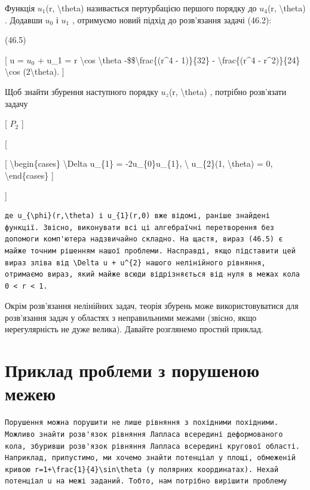 \documentclass[
]{article}
\begin{document}
{{{Функція \(u_1\)(r, \textbackslash theta) називається пертурбацією
першого порядку до \(u_4\)(r, \textbackslash theta) . Додавши \(u_0\) і
\(u_1\) , отримуємо новий підхід до розв'язання задачі (46.2):

(46.5)

{[} u = \(u_0\) + u\_1 = r \textbackslash cos \textbackslash theta
-\$\$\textbackslash frac\{(r\^{}4 - 1)\}\{32\} -
\textbackslash frac\{(r\^{}4 - r\^{}2)\}\{24\} \textbackslash cos
(2\textbackslash theta). {]}

Щоб знайти збурення наступного порядку \(u_{z}\)(r,
\textbackslash theta) , потрібно розв'язати задачу

{[} \(P_{2}\) {]}

{[}

{[} \textbackslash begin\{cases\} \textbackslash Delta u\_\{1\} =
-2u\_\{0\}u\_\{1\}, \textbackslash{} u\_\{2\}(1, \textbackslash theta) =
0, \textbackslash end\{cases\} {]}

{]}

\begin{verbatim}
де u_{\phi}(r,\theta) і u_{1}(r,0) вже відомі, раніше знайдені функції. Звісно, виконувати всі ці алгебраїчні перетворення без допомоги комп'ютера надзвичайно складно. На щастя, вираз (46.5) є майже точним рішенням нашої проблеми. Насправді, якщо підставити цей вираз зліва від \Delta u + u^{2} нашого нелінійного рівняння, отримаємо вираз, який майже всюди відрізняється від нуля в межах кола 0 < r < 1.
\end{verbatim}

Окрім розв'язання нелінійних задач, теорія збурень може
використовуватися для розв'язання задач у областях з неправильними
межами (звісно, якщо нерегулярність не дуже велика). Давайте розглянемо
простий приклад.

\section{Приклад проблеми з порушеною
межею}\label{ux43fux440ux438ux43aux43bux430ux434-ux43fux440ux43eux431ux43bux435ux43cux438-ux437-ux43fux43eux440ux443ux448ux435ux43dux43eux44e-ux43cux435ux436ux435ux44e}

\begin{verbatim}
Порушення можна порушити не лише рівняння з похідними похідними. Можливо знайти розв'язок рівняння Лапласа всередині деформованого кола, збуривши розв'язок рівняння Лапласа всередині кругової області. Наприклад, припустимо, ми хочемо знайти потенціал у площі, обмеженій кривою r=1+\frac{1}{4}\sin\theta (у полярних координатах). Нехай потенціал u на межі заданий. Тобто, нам потрібно вирішити проблему
\end{verbatim}

}}}
\end{document}
